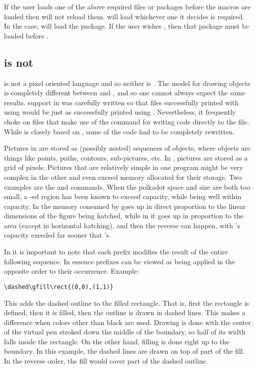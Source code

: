 \documentclass[letterpaper]{article}
\begin{document}
If the user loads one of the above required files or packages before the
\mfp{} macros are loaded then \mfp{} will not reload them. \Mfp{} will
load whichever one it decides is required. In the \LaTeXe{} case, \mfp{}
will load the  package. If the user wishes
, then that package must be loaded before \mfp{}.

\subsection{\CMP{} is not \MF{}}

\PS{} is not a pixel oriented language and so neither is \MP{}. The model
for drawing objects is completely different between \MF{} and \MP{}, and
so one cannot always expect the same results. \CMP{} support in
\mfp{} was carefully written so that files successfully printed
with \mfp{} using \MF{} would be just as successfully printed
using \MP{}. Nevertheless, it frequently choke on files that make use of
the  command for writing code directly to the  file.
While  is closely based on , some of
the code had to be completely rewritten.

Pictures in \MP{} are stored as (possibly nested) sequences of objects,
where objects are things like points, paths, contours, sub-pictures,
etc. In \MF{}, pictures are stored as a grid of pixels. Pictures that are
relatively simple in one program might be very complex in the other and
even exceed memory allocated for their storage. Two examples are the
 and  commands. When the polkadot space and size
are both too small, a -ed region has been known to exceed
\MP{} capacity, while being well within \MF{} capacity. In \MP{} the
memory consumed by  goes up in direct proportion to the linear
dimensions of the figure being hatched, while in \MF{} it goes up in
proportion to the area (except in horizontal hatching), and then the
reverse can happen, with \MF{}'s capacity exeeded far sooner that \MP{}'s.

In \MP{} it is important to note that each
prefix modifies the result of the entire following sequence. In essence
prefixes can be viewed as being applied in the opposite order to their
occurrence. Example:
\begin{verbatim}
\dashed\gfill\rect{(0,0),(1,1)}
\end{verbatim}
This adds the dashed outline to the filled rectangle. That is, first the
rectangle is defined, then it is filled, then the outline is drawn in
dashed lines. This makes a difference when colors other than black are
used. Drawing is done with the center of the virtual pen stroked down
the middle of the boundary, so half of its width falls inside the
rectangle. On the other hand, filling is done right up to the boundary.
In this example, the dashed lines are drawn on top of part of the fill.
In the reverse order, the fill would cover part of the dashed outline.
\end{document}
